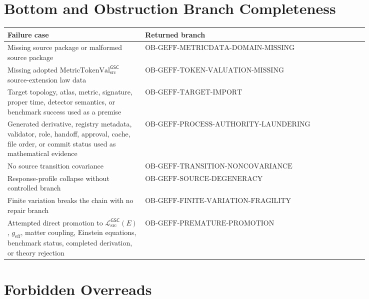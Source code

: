 \documentclass[11pt]{article}
\newcommand{\MetricTokenVal}{\mathrm{MetricTokenVal}_{\mathrm{src}}^{\mathsf{GSC}}}
\newcommand{\MetricData}{\mathcal{L}_{\mathrm{src}}^{\mathsf{GSC}}}
\newcommand{\geff}{g_{\mathrm{eff}}}
\begin{document}
\section{Bottom and Obstruction Branch Completeness}\label{bottom-and-obstruction-branch-completeness}

\begin{longtable}{p{0.32\linewidth}p{0.52\linewidth}}
\toprule
Failure case & Returned branch \\
\midrule
Missing source package or malformed source package &
\(\mathrm{OB\mbox{-}GEFF\mbox{-}METRICDATA\mbox{-}DOMAIN\mbox{-}MISSING}\) \\
Missing adopted \(\MetricTokenVal\) source-extension law data &
\(\mathrm{OB\mbox{-}GEFF\mbox{-}TOKEN\mbox{-}VALUATION\mbox{-}MISSING}\) \\
Target topology, atlas, metric, signature, proper time, detector semantics,
or benchmark success used as a premise &
\(\mathrm{OB\mbox{-}GEFF\mbox{-}TARGET\mbox{-}IMPORT}\) \\
Generated derivative, registry metadata, validator, role, handoff, approval,
cache, file order, or commit status used as mathematical evidence &
\(\mathrm{OB\mbox{-}GEFF\mbox{-}PROCESS\mbox{-}AUTHORITY\mbox{-}LAUNDERING}\) \\
No source transition covariance &
\(\mathrm{OB\mbox{-}GEFF\mbox{-}TRANSITION\mbox{-}NONCOVARIANCE}\) \\
Response-profile collapse without controlled branch &
\(\mathrm{OB\mbox{-}GEFF\mbox{-}SOURCE\mbox{-}DEGENERACY}\) \\
Finite variation breaks the chain with no repair branch &
\(\mathrm{OB\mbox{-}GEFF\mbox{-}FINITE\mbox{-}VARIATION\mbox{-}FRAGILITY}\) \\
Attempted direct promotion to \(\MetricData(E)\), \(\geff\), matter coupling,
Einstein equations, benchmark status, completed derivation, or theory
rejection &
\(\mathrm{OB\mbox{-}GEFF\mbox{-}PREMATURE\mbox{-}PROMOTION}\) \\
\bottomrule
\end{longtable}

\section{Forbidden Overreads}\label{forbidden-overreads}
\end{document}
